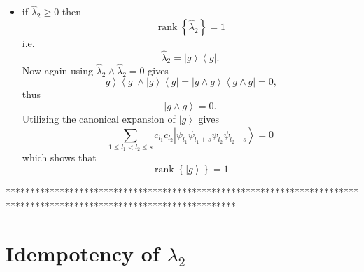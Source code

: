 \documentclass[aps,preprint]{revtex4}%
\begin{document}
\begin{itemize}
\item if $\hat{\lambda}_{2}\geq0$ then
\begin{equation}
\operatorname*{rank}\left\{  \hat{\lambda}_{2}\right\}  =1
\end{equation}
i.e.
\begin{equation}
\hat{\lambda}_{2}=\left\vert g\right\rangle \left\langle g\right\vert .
\end{equation}
Now again using $\hat{\lambda}_{2}\wedge\hat{\lambda}_{2}=0$ gives
\begin{equation}
\left\vert g\right\rangle \left\langle g\right\vert \wedge\left\vert
g\right\rangle \left\langle g\right\vert =\left\vert g\wedge g\right\rangle
\left\langle g\wedge g\right\vert =0,
\end{equation}
thus
\begin{equation}
\left\vert g\wedge g\right\rangle =0.
\end{equation}
Utilizing the canonical expansion of $\left\vert g\right\rangle $ gives
\begin{equation}
\sum_{1\leq l_{1}<l_{2}\leq s}c_{l_{1}}c_{l_{2}}\left\vert \psi_{l_{1}}%
\psi_{l_{1}+s}\psi_{l_{2}}\psi_{l_{2}+s}\right\rangle =0
\end{equation}
which shows that
\begin{equation}
\operatorname*{rank}\left\{  \left\vert g\right\rangle \right\}  =1
\end{equation}

\end{itemize}

\bigskip************************************************************************************************************************

\section{Idempotency of $\lambda_{2}$}
\end{document}
